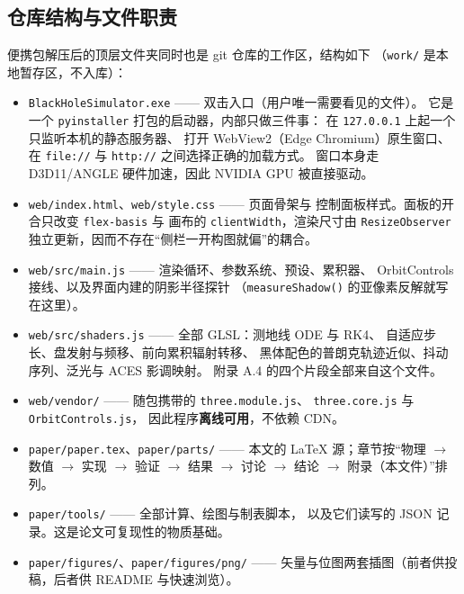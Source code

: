 \subsection{仓库结构与文件职责}\label{app:files}

便携包解压后的顶层文件夹同时也是 git 仓库的工作区，结构如下
（\texttt{work/} 是本地暂存区，不入库）：

\begin{itemize}[leftmargin=1.6em,itemsep=2.5pt,topsep=3pt]
  \item \texttt{BlackHoleSimulator.exe} —— 双击入口（用户唯一需要看见的文件）。
        它是一个 \texttt{pyinstaller} 打包的启动器，内部只做三件事：
        在 \texttt{127.0.0.1} 上起一个只监听本机的静态服务器、
        打开 WebView2（Edge Chromium）原生窗口、在
        \texttt{file://} 与 \texttt{http://} 之间选择正确的加载方式。
        窗口本身走 D3D11/ANGLE 硬件加速，因此 NVIDIA GPU 被直接驱动。
  \item \texttt{web/index.html}、\texttt{web/style.css} —— 页面骨架与
        控制面板样式。面板的开合只改变 \texttt{flex-basis} 与
        画布的 \texttt{clientWidth}，渲染尺寸由 \texttt{ResizeObserver}
        独立更新，因而不存在“侧栏一开构图就偏”的耦合。
  \item \texttt{web/src/main.js} —— 渲染循环、参数系统、预设、累积器、
        OrbitControls 接线、以及界面内建的阴影半径探针
        （\texttt{measureShadow()} 的亚像素反解就写在这里）。
  \item \texttt{web/src/shaders.js} —— 全部 GLSL：测地线 ODE 与 RK4、
        自适应步长、盘发射与频移、前向累积辐射转移、
        黑体配色的普朗克轨迹近似、抖动序列、泛光与 ACES 影调映射。
        附录 A.4 的四个片段全部来自这个文件。
  \item \texttt{web/vendor/} —— 随包携带的 \texttt{three.module.js}、
        \texttt{three.core.js} 与 \texttt{OrbitControls.js}，
        因此程序\textbf{离线可用}，不依赖 CDN。
  \item \texttt{paper/paper.tex}、\texttt{paper/parts/} —— 本文的
        \LaTeX{} 源；章节按“物理 $\to$ 数值 $\to$ 实现 $\to$ 验证 $\to$
        结果 $\to$ 讨论 $\to$ 结论 $\to$ 附录（本文件）”排列。
  \item \texttt{paper/tools/} —— 全部计算、绘图与制表脚本，
        以及它们读写的 JSON 记录。这是论文可复现性的物质基础。
  \item \texttt{paper/figures/}、\texttt{paper/figures/png/} ——
        矢量与位图两套插图（前者供投稿，后者供 README 与快速浏览）。

\end{itemize}
